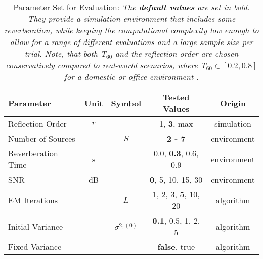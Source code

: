 \newcommand{\default}[1]{\textbf{#1}}
\begin{table}[H]
	\centering
	\begin{tabular}{lcccc}
		\toprule
		Parameter          & Unit & Symbol       & Tested Values                 & Origin      \\
		\midrule
		Reflection Order      & $r$  &              & 1, \default{3}, max           & simulation \\
		Number of Sources  &      & $S$          & \default{2 - 7}               & environment \\
		Reverberation Time & s    & \Tsixty      & 0.0, \default{0.3}, 0.6, 0.9  & environment \\
		SNR                & dB   &              & \default{0}, 5, 10, 15, 30    & environment \\
		EM Iterations      &      & $L$          & 1, 2, 3, \default{5}, 10, 20  & algorithm   \\
		Initial Variance   &      & $\sigma^{2,(0)}$ & \default{0.1}, $0.5$, 1, 2, 5 & algorithm   \\
		Fixed Variance     &      &              & \default{false}, true         & algorithm   \\
		\bottomrule
	\end{tabular}
	\label{table:parameterset}
	\caption[Parameter Set for Evaluation]{Parameter Set for Evaluation: \itshape The \textbf{default values} are set in bold. They provide a simulation environment that includes some reverberation, while keeping the computational complexity low enough to allow for a range of different evaluations and a large sample size per trial. Note, that both T$_{60}$ and the reflection order are chosen conservatively compared to real-world scenarios, where T$_{60}\in [0.2, 0.8]$ for a domestic or office environment \cite[p.695]{Gannot2017}.}
\end{table}
